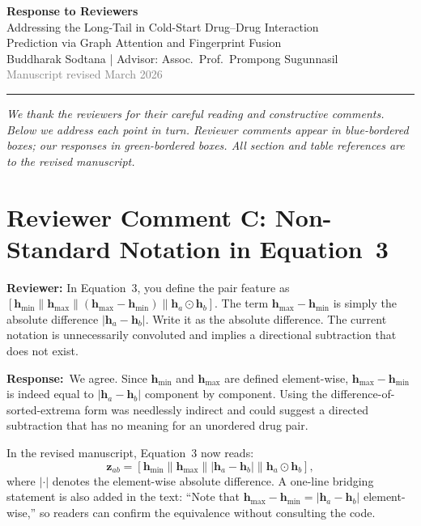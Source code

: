 \documentclass[11pt,a4paper]{article}
\newcommand{\reviewer}[1]{\textbf{\textcolor{reviewerbar}{Reviewer:}} #1}
\newcommand{\authorlabel}{\textbf{\textcolor{authorbar}{Response:}}}
\begin{document}

\begin{center}
  {\LARGE\bfseries Response to Reviewers}\\[0.5em]
  {\large Addressing the Long-Tail in Cold-Start Drug--Drug Interaction\\
  Prediction via Graph Attention and Fingerprint Fusion}\\[0.5em]
  {\normalsize Buddharak Sodtana \quad|\quad
  Advisor: Assoc.\ Prof.\ Prompong Sugunnasil}\\[0.3em]
  {\small\textcolor{gray}{Manuscript revised March 2026}}
\end{center}

\medskip
\noindent\rule{\textwidth}{0.4pt}
\medskip

\noindent\textit{%
We thank the reviewers for their careful reading and constructive comments.
Below we address each point in turn.
Reviewer comments appear in blue-bordered boxes; our responses in green-bordered boxes.
All section and table references are to the revised manuscript.}

\section{Reviewer Comment C: Non-Standard Notation in Equation~3}

\begin{reviewerbox}
\reviewer{In Equation~3, you define the pair feature as
$[\mathbf{h}_{\min} \| \mathbf{h}_{\max} \| (\mathbf{h}_{\max} - \mathbf{h}_{\min}) \| \mathbf{h}_a \odot \mathbf{h}_b]$.
The term $\mathbf{h}_{\max} - \mathbf{h}_{\min}$ is simply the absolute difference
$|\mathbf{h}_a - \mathbf{h}_b|$.
Write it as the absolute difference.
The current notation is unnecessarily convoluted and implies a directional
subtraction that does not exist.}
\end{reviewerbox}

\begin{authorbox}
\authorlabel\ We agree.
Since $\mathbf{h}_{\min}$ and $\mathbf{h}_{\max}$ are defined element-wise,
$\mathbf{h}_{\max} - \mathbf{h}_{\min}$ is indeed equal to $|\mathbf{h}_a - \mathbf{h}_b|$
component by component.
Using the difference-of-sorted-extrema form was needlessly indirect and could
suggest a directed subtraction that has no meaning for an unordered drug pair.

In the revised manuscript, Equation~3 now reads:
\begin{equation}
  \mathbf{z}_{ab} =
  [\mathbf{h}_{\min} \| \mathbf{h}_{\max} \|
   |\mathbf{h}_a - \mathbf{h}_b| \|
   \mathbf{h}_a \odot \mathbf{h}_b],
\end{equation}
where $|\cdot|$ denotes the element-wise absolute difference.
A one-line bridging statement is also added in the text:
``Note that $\mathbf{h}_{\max} - \mathbf{h}_{\min} = |\mathbf{h}_a - \mathbf{h}_b|$
element-wise,'' so readers can confirm the equivalence without consulting the code.
\end{authorbox}
\end{document}
